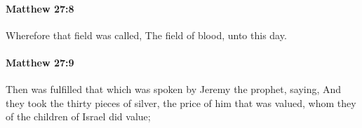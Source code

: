 		\paragraph{Matthew 27:8} %
			\label{MATTHEW-27-8}

			Wherefore that field was called, The field of blood, unto this day.

			\begin{framed}
			\scriptsize
				\begin{compactdesc}
					\item[SBLG] 
				\end{compactdesc}
			\end{framed}

		\paragraph{Matthew 27:9} %
			\label{MATTHEW-27-9}

			Then was fulfilled that which was spoken by Jeremy the prophet, saying, And they took the thirty pieces of silver, the price of him that was valued, whom they of the children of Israel did value;

